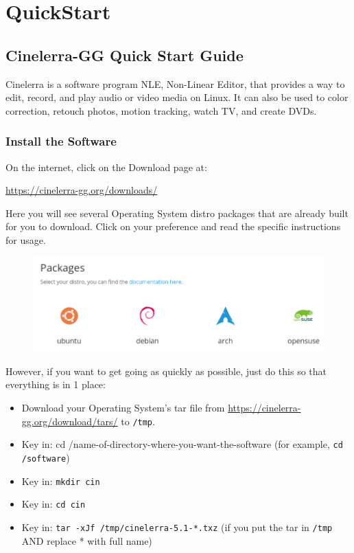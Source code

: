 \chapter{QuickStart}%
\label{cha:Quickstart}

\section{Cinelerra-GG Quick Start Guide}%
\label{sec:cin_quick_start_guide}

Cinelerra is a software program NLE, Non-Linear Editor, that provides a way to edit, record, and play audio or video media on Linux.   It can also be used to color correction, retouch photos, motion tracking, watch TV, and create DVDs.

\subsection{Install the Software}%
\label{sub:install_software}

On the internet, click on the Download page at:
\begin{center}
	{\small \url{https://cinelerra-gg.org/downloads/}}
\end{center}
Here you will see several Operating System distro packages that are already built for you to download.  Click on your preference and read the specific instructions for usage.

\begin{figure}[htpb]
	\centering
	\includegraphics[width=1.0\linewidth]{images/packages.png}		
\end{figure}

However, if you want to get going as quickly as possible, just do this so that everything is in 1 place:

\begin{itemize}[noitemsep]
	\item Download your Operating System’s tar file from {\small \url{https://cinelerra-gg.org/download/tars/}} to \texttt{/tmp}.
	\item Key in:  cd /name-of-directory-where-you-want-the-software (for example, \texttt{cd /software})
	\item Key in:  \texttt{mkdir cin}
	\item Key in:  \texttt{cd cin}
	\item Key in:  \texttt{tar -xJf /tmp/cinelerra-5.1-*.txz}   (if you put the tar in \texttt{/tmp} AND replace * with full name)
\end{itemize}

